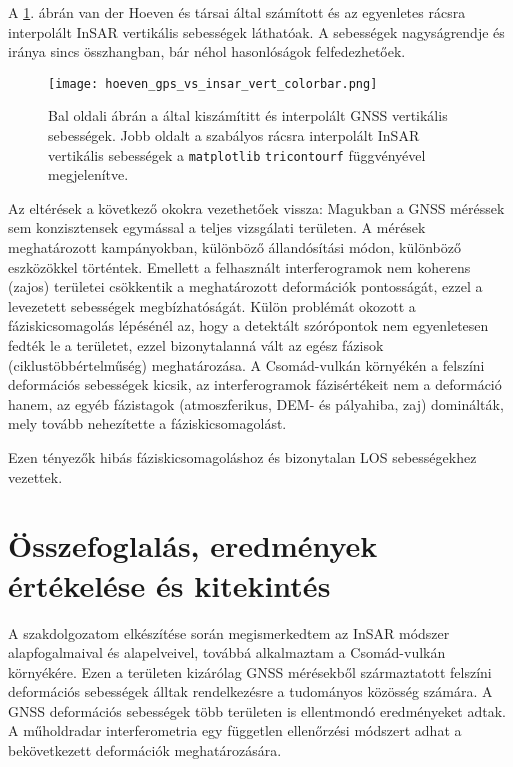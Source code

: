 \documentclass[12pt]{report}
\numberwithin{equation}{section}
\numberwithin{table}{section}
\numberwithin{figure}{section}
\begin{document}
A \ref{GNSS_vs_insar}. ábrán van der Hoeven és társai \cite{Hoeven2005} által számított és az egyenletes rácsra interpolált InSAR vertikális sebességek láthatóak. A sebességek nagyságrendje és iránya sincs összhangban, bár néhol hasonlóságok felfedezhetőek.

\begin{figure}[H]
    \centering
    \texttt{[image: hoeven\_gps\_vs\_insar\_vert\_colorbar.png]}
    \caption{Bal oldali ábrán a \cite{Hoeven2005} által kiszámítitt és interpolált GNSS vertikális sebességek. Jobb oldalt a szabályos rácsra interpolált InSAR vertikális sebességek a \texttt{matplotlib} \cite{matplotlib} \texttt{tricontourf} függvényével megjelenítve.}\label{GNSS_vs_insar}
\end{figure}

Az eltérések a következő okokra vezethetőek vissza: Magukban a GNSS méréssek sem konzisztensek egymással a teljes vizsgálati területen. A mérések meghatározott kampányokban, különböző állandósítási módon, különböző eszközökkel történtek. Emellett a felhasznált interferogramok nem koherens (zajos) területei csökkentik a meghatározott deformációk pontosságát, ezzel a levezetett sebességek megbízhatóságát. Külön problémát okozott a fáziskicsomagolás lépésénél az, hogy a detektált szórópontok nem egyenletesen fedték le a területet, ezzel bizonytalanná vált az egész fázisok (ciklustöbbértelműség) meghatározása. A Csomád-vulkán környékén a felszíni deformációs sebességek kicsik, az interferogramok fázisértékeit nem a deformáció hanem, az egyéb fázistagok (atmoszferikus, DEM- és pályahiba, zaj) dominálták, mely tovább nehezítette a fáziskicsomagolást.

Ezen tényezők hibás fáziskicsomagoláshoz és bizonytalan LOS sebességekhez vezettek.

\chapter{Összefoglalás, eredmények értékelése és kitekintés}

A szakdolgozatom elkészítése során megismerkedtem az InSAR módszer alapfogalmaival és alapelveivel, továbbá alkalmaztam a Csomád-vulkán környékére. Ezen a területen kizárólag GNSS mérésekből származtatott felszíni deformációs sebességek \cite{Hoeven2005, Schmitt2007} álltak rendelkezésre a tudományos közösség számára. A GNSS deformációs sebességek több területen is ellentmondó eredményeket adtak. A műholdradar interferometria egy független ellenőrzési módszert adhat a bekövetkezett deformációk meghatározására.
\end{document}
